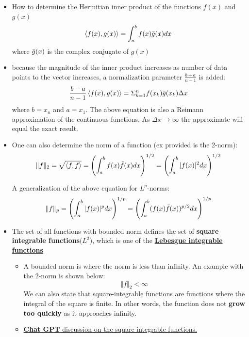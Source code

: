 \documentclass[11.5pt,a4paper]{article}
\begin{document}
\begin{itemize}
    \item How to determine the Hermitian inner product of the functions $f(x)$ and $g(x)$
    \begin{equation*}
        \left<f(x), g(x) \right> = \int_a^b f(x)\Bar{g}(x)dx
    \end{equation*}
    where $\Bar{g}(x)$ is the complex conjugate of $g(x)$
    
    \item because the magnitude of the inner product increases as number of data points to the vector increases, a normalization parameter $\frac{b-a}{n-1}$ is added:
    \begin{equation*}
        \frac{b-a}{n-1}\left<f(x), g(x) \right> = \Sigma_{k=1}^n f(x_k)\Bar{g}(x_k)\Delta x
    \end{equation*}
    where $b = x_n$ and $a = x_1$. The above equation is also a Reimann approximation of the continuous functions. As $\Delta x \rightarrow \infty$ the approximate will equal the exact result.

    \item One can also determine the norm of a function (ex provided is the 2-norm):
    \begin{equation*}
        \Vert f \Vert_2 = \sqrt{\left<f,f\right>} = \left(\int_a^b f(x)\Bar{f}(x)dx\right)^{1/2} =\left(\int_a^b |f(x)|^2dx\right)^{1/2} 
    \end{equation*}

    A generalization of the above equation for $L^{p}$-norms:
    \begin{equation*}
        \Vert f \Vert_p = \left(\int_a^b |f(x)|^p dx\right)^{1/p} = \left(\int_a^b (f(x)\Bar{f}(x))^{p/2} dx\right)^{1/p}
    \end{equation*}

    \item The set of all functions with bounded norm defines the set of \textbf{square integrable functions}($L^2$), which is one of the \href{https://www.youtube.com/watch?v=Fb2ei6lD-d8}{\textbf{Lebesgue integrable functions}}
    \begin{itemize}
        \item A bounded norm is where the norm is less than infinity. An example with the 2-norm is shown below:
        \begin{equation*}
            \Vert f \Vert_2 < \infty
        \end{equation*}
        We can also state that square-integrable functions are functions where the integral of the square is finite. In other words, the function does not \textbf{grow too quickly} as it approaches infinity.
        \item \href{https://chatgpt.com/c/68449325-132c-800a-a44a-c16de2d9b362}{\textbf{Chat GPT} discussion on the square integrable functions.}
    \end{itemize}


\end{itemize}
\end{document}
